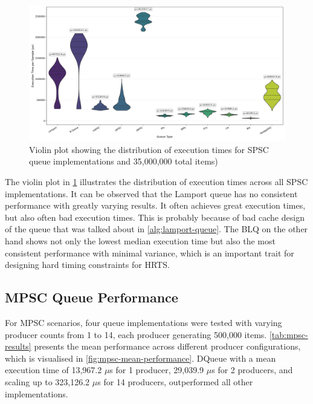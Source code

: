 \begin{figure}[htb]
\centering
\caption{Violin plot showing the distribution of execution times for \ac{SPSC} queue implementations and 35,000,000 total items)}
\label{fig:spsc-violin}
\includegraphics[width=\textwidth]{images/results/spsc_queue_performance_violin_test.png}
\end{figure}

The violin plot in \cref{fig:spsc-violin} illustrates the distribution of execution times across all SPSC implementations. It can be observed that the Lamport queue has no consistent performance with greatly varying results. It often achieves great execution times, but also often bad execution times. This is probably because of bad cache design of the queue that was talked about in \cref{alg:lamport-queue}. The \ac{BLQ} on the other hand shows not only the lowest median execution time but also the most consistent performance with minimal variance, which is an important trait for designing hard timing constraints for \ac{HRTS}. 

\subsection{\acf{MPSC} Queue Performance}
For \ac{MPSC} scenarios, four queue implementations were tested with varying producer counts from 1 to 14, each producer generating 500,000 items. \cref{tab:mpsc-results} presents the mean performance across different producer configurations, which is visualised in \cref{fig:mpsc-mean-performance}. DQueue with a mean execution time of 13,967.2 $\mu$s for 1 producer, 29,039.9 $\mu$s for 2 producers, and scaling up to 323,126.2 $\mu$s for 14 producers, outperformed all other implementations.

